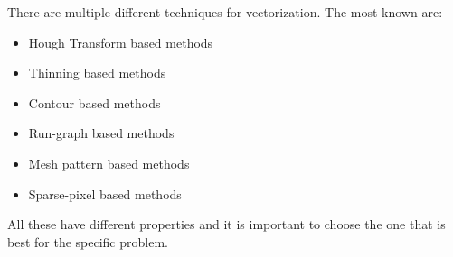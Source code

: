There are multiple different techniques for vectorization. The most known are:

\begin{itemize}
	\item Hough Transform based methods
	\item Thinning based methods
	\item Contour based methods
	\item Run-graph based methods
	\item Mesh pattern based methods
	\item Sparse-pixel based methods
\end{itemize}

All these have different properties and it is important to choose the one that is best for the specific problem. 